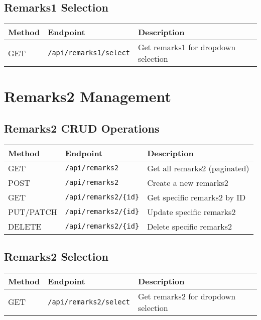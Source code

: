 \documentclass[12pt,a4paper]{article}
\begin{document}
\subsection{Remarks1 Selection}

\begin{longtable}{|p{}|p{}|p{}|}
\hline
\textbf{Method} & \textbf{Endpoint} & \textbf{Description} \\
\hline
\endhead

GET & \texttt{/api/remarks1/select} & Get remarks1 for dropdown selection \\
\hline
\end{longtable}

\section{Remarks2 Management}

\subsection{Remarks2 CRUD Operations}

\begin{longtable}{|p{}|p{}|p{}|}
\hline
\textbf{Method} & \textbf{Endpoint} & \textbf{Description} \\
\hline
\endhead

GET & \texttt{/api/remarks2} & Get all remarks2 (paginated) \\
POST & \texttt{/api/remarks2} & Create a new remarks2 \\
GET & \texttt{/api/remarks2/\{id\}} & Get specific remarks2 by ID \\
PUT/PATCH & \texttt{/api/remarks2/\{id\}} & Update specific remarks2 \\
DELETE & \texttt{/api/remarks2/\{id\}} & Delete specific remarks2 \\
\hline
\end{longtable}

\subsection{Remarks2 Selection}

\begin{longtable}{|p{}|p{}|p{}|}
\hline
\textbf{Method} & \textbf{Endpoint} & \textbf{Description} \\
\hline
\endhead

GET & \texttt{/api/remarks2/select} & Get remarks2 for dropdown selection \\
\hline
\end{longtable}
\end{document}
